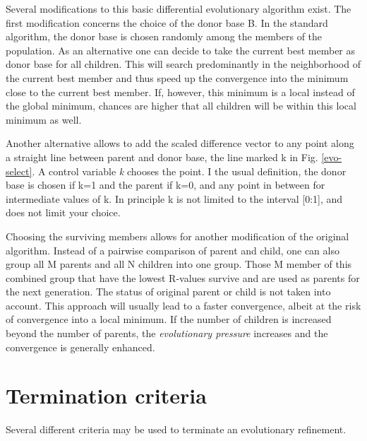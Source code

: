 Several modifications to this basic differential evolutionary
algorithm exist. The first modification concerns the choice of the
donor base B. In the standard algorithm, the donor base is chosen
randomly among the members of the population. As an alternative one
can decide to take the current best member as donor base for all
children. This will search predominantly in the neighborhood of the
current best member and thus speed up the convergence into the 
minimum close to the current best member. If, however, this minimum
is a local instead of the global minimum, chances are higher that 
all children will be within this local minimum as well.

Another alternative allows to add the scaled difference vector to
any point along a straight line between parent and donor base, the 
line marked k in Fig. \ref{evo-select}. A control variable 
{\em k} chooses the point. I the usual definition, the donor base 
is chosen if k=1 and the parent if k=0, and any point in between
for intermediate values of k. In principle k is not limited to 
the interval [0:1], and \Diffev does not limit your choice. 

Choosing the surviving members allows for another modification of the
original algorithm. Instead of a pairwise comparison of parent and
child, one can also group all M parents and all N children into one group.
Those M member of this combined group that have the lowest R-values
survive and are used as parents for the next generation. The status of
original parent or child is not taken into account. This approach will
usually lead to a faster convergence, albeit at the risk of convergence 
into a local minimum. If the number of children is increased 
beyond the number of parents, the 
{\em evolutionary pressure} increases and the convergence is generally
enhanced.


\section{Termination criteria \label{diff-term}}

Several different criteria may be used to terminate an evolutionary
refinement. 

